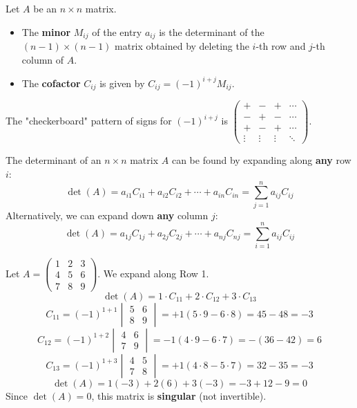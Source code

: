 \begin{definition}
Let $A$ be an $n \times n$ matrix.
\begin{itemize}
    \item The \textbf{minor} $M_{ij}$ of the entry $a_{ij}$ is the determinant of the $(n-1) \times (n-1)$ matrix obtained by deleting the $i$-th row and $j$-th column of $A$.
    \item The \textbf{cofactor} $C_{ij}$ is given by $C_{ij} = (-1)^{i+j} M_{ij}$.
\end{itemize}
\end{definition}

The "checkerboard" pattern of signs for $(-1)^{i+j}$ is $\begin{pmatrix} + & - & + & \cdots \\ - & + & - & \cdots \\ + & - & + & \cdots \\ \vdots & \vdots & \vdots & \ddots \end{pmatrix}$.

\begin{theorem}
The determinant of an $n \times n$ matrix $A$ can be found by expanding along \textbf{any} row $i$:
\[ \det(A) = a_{i1}C_{i1} + a_{i2}C_{i2} + \cdots + a_{in}C_{in} = \sum_{j=1}^{n} a_{ij}C_{ij} \]
Alternatively, we can expand down \textbf{any} column $j$:
\[ \det(A) = a_{1j}C_{1j} + a_{2j}C_{2j} + \cdots + a_{nj}C_{nj} = \sum_{i=1}^{n} a_{ij}C_{ij} \]
\end{theorem}

\begin{example}
Let $A = \begin{pmatrix} 1 & 2 & 3 \\ 4 & 5 & 6 \\ 7 & 8 & 9 \end{pmatrix}$. We expand along Row 1.
\[ \det(A) = 1 \cdot C_{11} + 2 \cdot C_{12} + 3 \cdot C_{13} \]
\[ C_{11} = (-1)^{1+1} \begin{vmatrix} 5 & 6 \\ 8 & 9 \end{vmatrix} = +1(5\cdot 9 - 6\cdot 8) = 45 - 48 = -3 \]
\[ C_{12} = (-1)^{1+2} \begin{vmatrix} 4 & 6 \\ 7 & 9 \end{vmatrix} = -1(4\cdot 9 - 6\cdot 7) = -(36 - 42) = 6 \]
\[ C_{13} = (-1)^{1+3} \begin{vmatrix} 4 & 5 \\ 7 & 8 \end{vmatrix} = +1(4\cdot 8 - 5\cdot 7) = 32 - 35 = -3 \]
\[ \det(A) = 1(-3) + 2(6) + 3(-3) = -3 + 12 - 9 = 0 \]
Since $\det(A) = 0$, this matrix is \textbf{singular} (not invertible).
\end{example}

